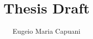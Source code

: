 \documentclass[a4paper,11pt]{article}
\begin{document}
\pagestyle{empty}
\title{Thesis Draft}
\author{Eugeio Maria Capuani}
\maketitle
\cleardoublepage

\cleardoublepage

\cleardoublepage

\cleardoublepage
\thispagestyle{empty}
\printbibliography    
\end{document}
